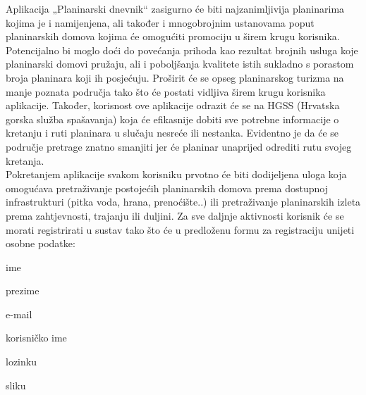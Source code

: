 		Aplikacija „Planinarski dnevnik“ zasigurno će biti najzanimljivija planinarima kojima je i namijenjena, ali također i mnogobrojnim ustanovama poput planinarskih domova kojima će omogućiti promociju u širem krugu korisnika. Potencijalno bi moglo doći do povećanja prihoda kao rezultat brojnih usluga koje planinarski domovi pružaju, ali i poboljšanja kvalitete istih sukladno s porastom broja planinara koji ih posjećuju. Proširit će se opseg planinarskog turizma na manje poznata područja tako što će postati vidljiva širem krugu korisnika aplikacije. Također, korisnost ove aplikacije odrazit će se na HGSS (Hrvatska gorska služba spašavanja) koja će efikasnije dobiti sve potrebne informacije o kretanju i ruti planinara u slučaju nesreće ili nestanka. Evidentno je da će se područje pretrage znatno smanjiti jer će planinar unaprijed odrediti rutu svojeg kretanja.\\
		
		Pokretanjem aplikacije svakom korisniku prvotno će biti dodijeljena uloga  koja omogućava pretraživanje postojećih planinarskih domova prema dostupnoj infrastrukturi (pitka voda, hrana, prenoćište..) ili
		pretraživanje planinarskih izleta prema zahtjevnosti, trajanju ili duljini. Za sve daljnje aktivnosti korisnik će se morati registrirati u sustav tako što će u predloženu formu za registraciju unijeti osobne podatke:
		\begin{packed_item}
			\item ime
			\item prezime
			\item e-mail
			\item korisničko ime
			\item lozinku
			\item sliku	
		\end{packed_item}
	 
